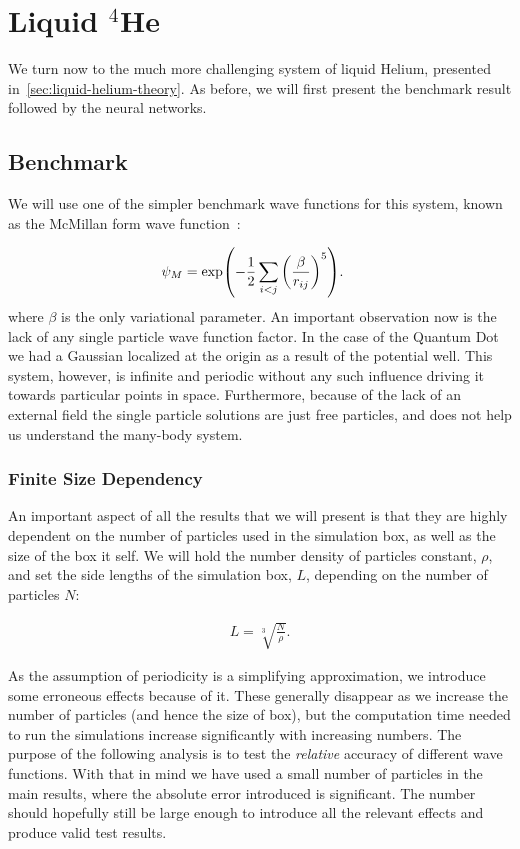 \documentclass[Thesis.tex]{subfiles}
\begin{document}
\chapter{Liquid $^4$He}
\label{chp:liquid-helium}

We turn now to the much more challenging system of liquid Helium, presented
in~\cref{sec:liquid-helium-theory}. As before, we will first present the
benchmark result followed by the neural networks.


\section{Benchmark}

We will use one of the simpler benchmark wave functions for this system, known
as the McMillan form wave function~\cite{McMillan-1965}:

\begin{align}
  \label{eq:McMillan-wave-function-def}
  \psi_{M} &= \exp(-\frac{1}{2}\sum_{i<j} \qty(\frac{\beta}{r_{ij}})^5).
\end{align}
where $\beta$ is the only variational parameter. An important observation now is
the lack of any single particle wave function factor. In the case of the Quantum
Dot we had a Gaussian localized at the origin as a result of the potential well.
This system, however, is infinite and periodic without any such influence
driving it towards particular points in space. Furthermore, because of the lack
of an external field the single particle solutions are just free particles, and
does not help us understand the many-body system.

\subsection{Finite Size Dependency}

An important aspect of all the results that we will present is that they are
highly dependent on the number of particles used in the simulation box, as well
as the size of the box it self. We will hold the number density of particles
constant, $\rho$, and set the side lengths of the simulation box, $L$, depending on
the number of particles $N$:

\begin{align}
  L = \sqrt[3]{\frac{N}{\rho}}.
\end{align}

\noindent As the assumption of periodicity is a simplifying approximation, we
introduce some erroneous effects because of it. These generally disappear as we
increase the number of particles (and hence the size of box), but the
computation time needed to run the simulations increase significantly with
increasing numbers. The purpose of the following analysis is to test the
\emph{relative} accuracy of different wave functions. With that in mind we have
used a small number of particles in the main results, where the absolute error
introduced is significant. The number should hopefully still be large enough to
introduce all the relevant effects and produce valid test results.
\end{document}
